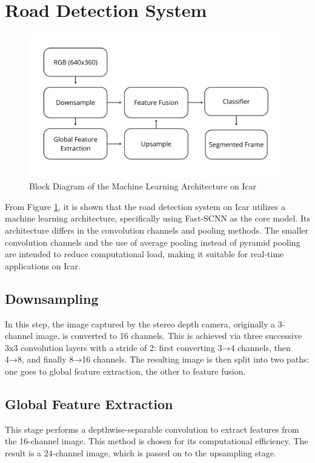 \section{Road Detection System}
\begin{figure}[H]
	\centering
	\includegraphics[width=\linewidth]{../konten/ml_sys.png}
	\caption{Block Diagram of the Machine Learning Architecture on Icar}
	\label{fig:ml_system}
\end{figure} 

From Figure \ref{fig:ml_system}, it is shown that the road detection system on Icar utilizes a machine learning architecture, specifically using Fast-SCNN \cite{ref_fast_scnn} as the core model. Its architecture differs in the convolution channels and pooling methods. The smaller convolution channels and the use of average pooling instead of pyramid pooling are intended to reduce computational load, making it suitable for real-time applications on Icar.

\subsection{Downsampling} 
In this step, the image captured by the stereo depth camera, originally a 3-channel image, is converted to 16 channels. This is achieved via three successive 3x3 convolution layers with a stride of 2: first converting 3→4 channels, then 4→8, and finally 8→16 channels. The resulting image is then split into two paths: one goes to global feature extraction, the other to feature fusion.

\subsection{Global Feature Extraction}
This stage performs a depthwise-separable convolution to extract features from the 16-channel image. This method is chosen for its computational efficiency. The result is a 24-channel image, which is passed on to the upsampling stage.

